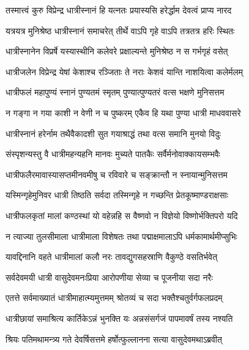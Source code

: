 \twolineshloka
{तस्मात्त्वं कुरु विप्रेन्द्र धात्रीस्नानं हि यत्नतः}
{प्रयास्यसि हरेर्द्धाम देवत्वं प्राप्य नारद} %

\twolineshloka
{यत्रयत्र मुनिश्रेष्ठ धात्रीस्नानं समाचरेत्}
{तीर्थे वाऽपि गृहे वाऽपि तत्रतत्र हरिः स्थितः} %

\twolineshloka
{धात्रीस्नानेन विप्रर्षे यस्यास्थीनि कलेवरे}
{प्रक्षाल्यन्ते मुनिश्रेष्ठ न स गर्भगृहं वसेत्} %

\twolineshloka
{धात्रीजलेन विप्रेन्द्र येषां केशाश्च रञ्जिताः}
{ते नराः केशवं यान्ति नाशयित्वा कलेर्मलम्} %

\twolineshloka
{धात्रीफलं महापुण्यं स्नानं पुण्यतमं स्मृतम्}
{पुण्यात्पुण्यतरं वत्स भक्षणे मुनिसत्तम} %

\twolineshloka
{न गङ्गा न गया काशी न वेणी न च पुष्करम्}
{एकैव हि यथा पुण्या धात्री माधववासरे} %

\twolineshloka
{धात्रीस्नानं हरेर्नाम तथैवैकादशी सुत}
{गयाश्राद्धं तथा वत्स समानि मुनयो विदुः} %

\twolineshloka
{संस्पृशन्यस्तु वै धात्रीमहन्यहनि मानवः}
{मुच्यते पातकैः सर्वैर्मनोवाक्कायसम्भवैः} %

\twolineshloka
{धात्रीफलैरमावास्यासप्तमीनवमीषु च}
{रविवारे च सङ्क्रान्तौ न स्नायान्मुनिसत्तम} %

\twolineshloka
{यस्मिन्गृहेमुनिवर धात्री तिष्ठति सर्वदा}
{तस्मिन्गृहे न गच्छन्ति प्रेतकूष्माण्डराक्षसाः} %

\twolineshloka
{धात्रीफलकृतां मालां कण्ठस्थां यो वहेन्नहि}
{स वैष्णवो न विज्ञेयो विष्णोर्भक्तिपरो यदि} %

\twolineshloka
{न त्याज्या तुलसीमाला धात्रीमाला विशेषतः}
{तथा पद्माक्षमालाऽपि धर्मकामार्थमीप्सुभिः} %

\twolineshloka
{यावद्दिनानि वहते धात्रीमालां कलौ नरः}
{तावद्युगसहस्राणि वैकुण्ठे वसतिर्भवेत्} %

\twolineshloka
{सर्वदेवमयी धात्री वासुदेवमनःप्रिया}
{आरोपणीया सेव्या च पूजनीया सदा नरैः} %

\twolineshloka
{एतत्ते सर्वमाख्यातं धात्रीमाहात्म्यमुत्तमम्}
{श्रोतव्यं च सदा भक्तैश्चतुर्वर्गफलप्रदम्} %

\twolineshloka
{धात्रीछायां समाश्रित्य कार्तिकेऽन्नं भुनक्ति यः}
{अन्नसंसर्गजं पापमावर्षं तस्य नश्यति} %





\twolineshloka
{श्रियः पतिमथामन्त्र्य गते देवर्षिसत्तमे}
{हर्षोत्फुल्लानना सत्या वासुदेवमथाऽब्रवीत्} %


